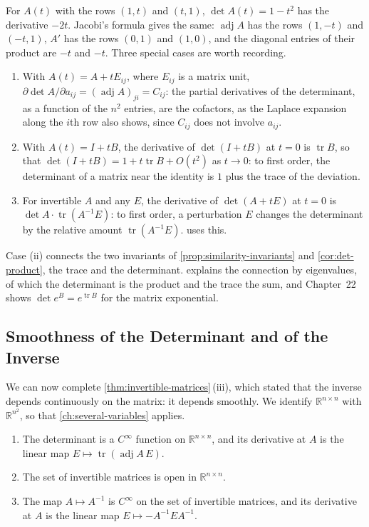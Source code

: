 For $A(t)$ with the rows $(1,t)$ and $(t,1)$, $\det A(t)=1-t^2$ has the derivative $-2t$. Jacobi's formula gives the same: $\operatorname{adj}A$ has the rows $(1,-t)$ and $(-t,1)$, $A'$ has the rows $(0,1)$ and $(1,0)$, and the diagonal entries of their product are $-t$ and $-t$. Three special cases are worth recording.
\begin{enumerate}
\item With $A(t)=A+tE_{ij}$, where $E_{ij}$ is a matrix unit, $\partial\det A/\partial a_{ij}=(\operatorname{adj}A)_{ji}=C_{ij}$: the partial derivatives of the determinant, as a function of the $n^2$ entries, are the cofactors, as the Laplace expansion along the $i$th row also shows, since $C_{ij}$ does not involve $a_{ij}$.
\item With $A(t)=I+tB$, the derivative of $\det(I+tB)$ at $t=0$ is $\operatorname{tr}B$, so that $\det(I+tB)=1+t\operatorname{tr}B+O(t^2)$ as $t\to0$: to first order, the determinant of a matrix near the identity is $1$ plus the trace of the deviation.
\item For invertible $A$ and any $E$, the derivative of $\det(A+tE)$ at $t=0$ is $\det A\cdot\operatorname{tr}(A^{-1}E)$: to first order, a perturbation $E$ changes the determinant by the relative amount $\operatorname{tr}(A^{-1}E)$.  uses this.
\end{enumerate}
Case (ii) connects the two invariants of \cref{prop:similarity-invariants} and \cref{cor:det-product}, the trace and the determinant.  explains the connection by eigenvalues, of which the determinant is the product and the trace the sum, and Chapter~22 shows $\det e^B=e^{\operatorname{tr}B}$ for the matrix exponential.

\subsection{Smoothness of the Determinant and of the Inverse}

We can now complete \cref{thm:invertible-matrices}\,(iii), which stated that the inverse depends continuously on the matrix: it depends smoothly. We identify $\mathbb R^{n\times n}$ with $\mathbb R^{n^2}$, so that \cref{ch:several-variables} applies.

\begin{theorem}
\label{thm:det-smooth}
\leavevmode
\begin{enumerate}
\item The determinant is a $C^\infty$ function on $\mathbb R^{n\times n}$, and its derivative at $A$ is the linear map $E\mapsto\operatorname{tr}(\operatorname{adj}A\,E)$.
\item The set of invertible matrices is open in $\mathbb R^{n\times n}$.
\item The map $A\mapsto A^{-1}$ is $C^\infty$ on the set of invertible matrices, and its derivative at $A$ is the linear map $E\mapsto-A^{-1}EA^{-1}$.
\end{enumerate}
\end{theorem}

